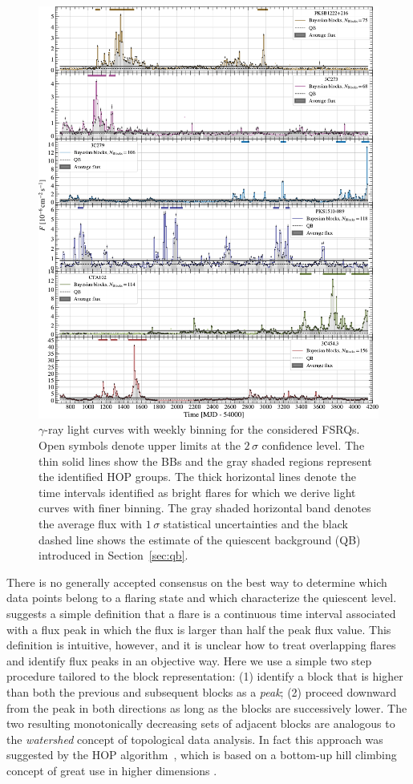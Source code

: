 \documentclass[twocolumn,linenumbers]{aastex62}
\newcommand{\gray}{$\gamma$-ray\xspace}
\begin{document}
\begin{figure}
    \centering
    \includegraphics[width = .9\linewidth]{lc_weekly_tsmin9.pdf}
    \caption{\gray light curves with weekly binning for the considered FSRQs. Open symbols denote upper limits at the $2\,\sigma$ confidence level. The thin solid lines show the BBs and the gray shaded regions represent the identified HOP groups. The thick horizontal lines denote the time intervals identified as bright flares for which we derive light curves with finer binning.
    The gray shaded horizontal band denotes the average flux with $1\,\sigma$ statistical uncertainties and the black dashed line shows the estimate of the quiescent background (QB) introduced in Section~\ref{sec:qb}.}
    \label{fig:weekly}
\end{figure}

There is no generally accepted consensus on the best way to determine which data points belong to a flaring state and which characterize the quiescent level. \citet{2013MNRAS.430.1324N} suggests a simple definition that a flare is a continuous time interval associated with a flux peak in which the flux is larger than half the peak flux value. 
This definition is intuitive, however, and it is unclear how to treat overlapping flares and identify flux peaks in an objective way. 
Here we use a simple two step procedure tailored to the block representation: (1) identify a block that is higher than both the previous and subsequent blocks as a \textit{peak}; (2) proceed downward from the peak in both directions as long as the blocks are successively lower.
The two resulting monotonically decreasing sets of adjacent blocks are analogous to the \textit{watershed} concept of topological data analysis.
In fact this approach was suggested by the 
HOP algorithm~\citep{1998ApJ...498..137E}, which is based on a bottom-up hill climbing concept of great use in higher dimensions \citep[e.g.,][]{2011ApJ...727...48W}.
\end{document}
